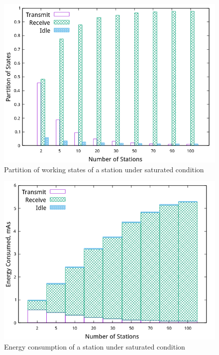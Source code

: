 \begin{figure}[!h]
\centering
\includegraphics[scale=0.85]{./figure/chp1/n_state_partition.png}
\caption{Partition of working states of a station under saturated condition}
\label{fig_part_state}
\end{figure}

\begin{figure}[!h]
\centering
\includegraphics[scale=0.85]{./figure/chp1/n_energy_partition.png}
\caption{Energy consumption of a station under saturated condition}
\label{fig_eng}
\end{figure}


